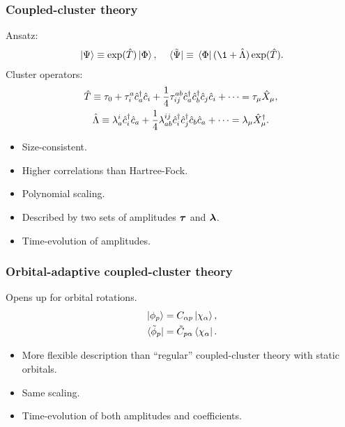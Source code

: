 \documentclass{beamer}
\begin{document}
\begin{frame}
    \frametitle{Coupled-cluster theory}
    Ansatz:
    \begin{gather}
        \ket*{\Psi} \equiv \exponential(\clust)\ket*{\slat},
        \quad
        \bra*{\tilde{\Psi}} \equiv
        \bra*{\slat}(\1 + \clustl)\exponential(\clust).
    \end{gather}
    Cluster operators:
    \begin{gather}
        \hat{T} \equiv \tau_0
        + \tau^{a}_{i}\hat{c}_{a}^{\dagger}\hat{c}_{i}
        + \frac{1}{4}\tau^{ab}_{ij}\hat{c}_{a}^{\dagger}\hat{c}_{b}^{\dagger}\hat{c}_{j}\hat{c}_{i}
        + \dots
        = \tau_{\mu}\hat{X}_{\mu},
        \\
        \hat{\Lambda} \equiv
        \lambda^{i}_{a}\hat{c}_{i}^{\dagger}\hat{c}_{a}
        + \frac{1}{4}\lambda^{ij}_{ab}\hat{c}_{i}^{\dagger}\hat{c}_{j}^{\dagger}\hat{c}_{b}\hat{c}_{a}
        + \dots
        = \lambda_{\mu}\hat{X}^{\dagger}_{\mu}.
    \end{gather}
    \begin{itemize}
        \item Size-consistent.
        \item Higher correlations than Hartree-Fock.
        \item Polynomial scaling.
        \item Described by two sets of amplitudes $\boldsymbol{\tau}$ and
            $\boldsymbol{\lambda}$.
        \item Time-evolution of amplitudes.
    \end{itemize}
\end{frame}

\begin{frame}
    \frametitle{Orbital-adaptive coupled-cluster theory}
    Opens up for orbital rotations.
    \begin{gather}
        \ket*{\phi_p} = C_{\alpha p}\ket*{\chi_{\alpha}}, \\
        \bra*{\tilde{\phi}_{p}} = \tilde{C}_{p \alpha} \bra*{\chi_{\alpha}}.
    \end{gather}
    \begin{itemize}
        \item More flexible description than ``regular'' coupled-cluster theory
            with static orbitals.
        \item Same scaling.
        \item Time-evolution of both amplitudes and coefficients.
    \end{itemize}
\end{frame}
\end{document}
